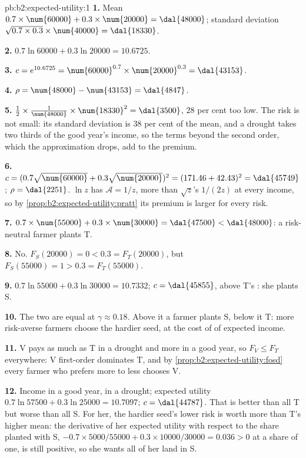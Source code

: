 \begin{solution}{pb:b2:expected-utility:1}
\textbf{1.} Mean $0.7 \times \num{60000} + 0.3 \times \num{20000} = \dal{48000}$; standard deviation
$\sqrt{0.7 \times 0.3} \times \num{40000} = \dal{18330}$.

\textbf{2.} $0.7\ln\num{60000} + 0.3\ln\num{20000} = 10.6725$.

\textbf{3.} $c = e^{10.6725} = \num{60000}^{0.7} \times \num{20000}^{0.3} = \dal{43153}$.

\textbf{4.} $\rho = \num{48000} - \num{43153} = \dal{4847}$.

\textbf{5.} $\tfrac12 \times \tfrac{1}{\num{48000}} \times \num{18330}^2 = \dal{3500}$, 28 per cent too
low. The risk is not small: its standard deviation is 38 per cent of the mean, and a drought takes
two thirds of the good year's income, so the terms beyond the second order, which the approximation
drops, add to the premium.

\textbf{6.} $c = (0.7\sqrt{\num{60000}} + 0.3\sqrt{\num{20000}})^2 = (171.46 + 42.43)^2 = \dal{45749}$;
$\rho = \dal{2251}$. $\ln z$ has $\mathcal{A} = 1/z$, more than $\sqrt z$'s $1/(2z)$ at every income,
so by \cref{prop:b2:expected-utility:pratt} its premium is larger for every risk.

\textbf{7.} $0.7 \times \num{55000} + 0.3 \times \num{30000} = \dal{47500} < \dal{48000}$: a
risk-neutral farmer plants T.

\textbf{8.} No. $F_S(\num{20000}) = 0 < 0.3 = F_T(\num{20000})$, but $F_S(\num{55000}) = 1 > 0.3 =
F_T(\num{55000})$.

\textbf{9.} $0.7\ln\num{55000} + 0.3\ln\num{30000} = 10.7332$; $c = \dal{45855}$, above T's
: she plants S.

\textbf{10.} The two  are equal at $\gamma \approx 0.18$. Above it a farmer plants
S, below it T: more risk-averse farmers choose the hardier seed, at the cost of  of expected
income.

\textbf{11.} V pays as much as T in a drought and more in a good year, so $F_V \le F_T$ everywhere:
V first-order dominates T, and by \cref{prop:b2:expected-utility:fosd} every farmer who prefers more to
less chooses V.

\textbf{12.} Income  in a good year,  in a drought; expected utility
$0.7\ln\num{57500} + 0.3\ln\num{25000} = 10.7097$; $c = \dal{44787}$. That is better than all T but
worse than all S. For her, the hardier seed's lower risk is worth more than T's higher mean: the
derivative of her expected utility with respect to the share planted with S, $-0.7 \times
\num{5000}/\num{55000} + 0.3 \times \num{10000}/\num{30000} = 0.036 > 0$ at a share of one, is still
positive, so she wants all of her land in S.


\end{solution}
